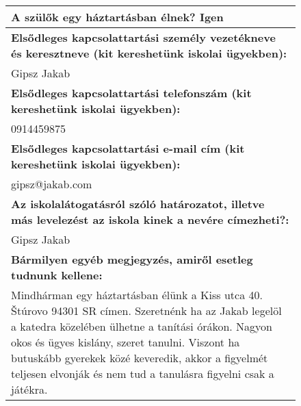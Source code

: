 \documentclass[10pt,a4paper]{article}
\begin{document}
\begin{figure}[!ht]
\begin{tabular}{|m{\textwidth}|}
\hline\vspace{3pt}
\textbf{A szülők egy háztartásban élnek? } \hspace{0.5cm} Igen \vspace{3pt} \\
\hline\vspace{3pt}
\textbf{Elsődleges kapcsolattartási személy vezetékneve és keresztneve (kit kereshetünk iskolai ügyekben):} \\ \hspace{0.5cm} Gipsz Jakab \vspace{3pt} \\
\hline\vspace{3pt}
\textbf{Elsődleges kapcsolattartási telefonszám (kit kereshetünk iskolai ügyekben):} \\ \hspace{0.5cm} 0914459875 \vspace{3pt} \\
\hline\vspace{3pt}
\textbf{Elsődleges kapcsolattartási e-mail cím (kit kereshetünk iskolai ügyekben):} \\ \hspace{0.5cm} gipsz@jakab.com \vspace{3pt} \\
\hline\vspace{3pt}
\textbf{Az iskolalátogatásról szóló határozatot, illetve más levelezést az iskola kinek a nevére címezheti?:} \\ \hspace{0.5cm} Gipsz Jakab \vspace{3pt} \\
\hline\vspace{3pt}
\textbf{Bármilyen egyéb megjegyzés, amiről esetleg tudnunk kellene:} \\ \hspace{0.5cm} Mindhárman egy háztartásban élünk a Kiss utca 40. Štúrovo 94301 SR címen.
Szeretnénk ha az Jakab legelöl a katedra közelében ülhetne a tanítási órákon. Nagyon okos és ügyes kislány, szeret tanulni. Viszont ha butuskább gyerekek közé keveredik, akkor a figyelmét teljesen elvonják és nem tud a tanulásra figyelni csak a játékra. \vspace{3pt} \\


\end{tabular}
\end{figure}
\end{document}
